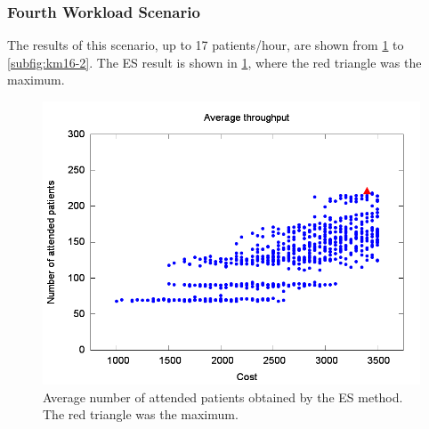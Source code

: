 \documentclass[11pt]{article} %
\begin{document}
\subsubsection{Fourth Workload Scenario}

The results of this scenario, up to 17 patients/hour, are shown from
\ref{subfig:es16-2} to \ref{subfig:km16-2}. The ES result is shown
in \ref{subfig:es16-2}, where the red triangle was the maximum. 
\begin{figure}[H]
\centering{}\includegraphics[width=0.95\columnwidth,height=0.25\paperheight]{figs4/v02/6400-602-100-exh-throughput-max}
\caption{Average number of attended patients obtained by the ES method. The
red triangle was the maximum.\label{subfig:es16-2}}
\end{figure}
\end{document}
